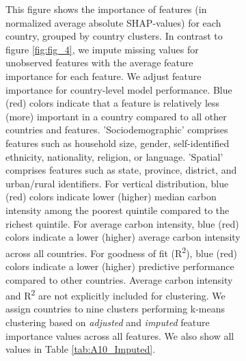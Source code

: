 \begin{figure}[ht!]
\begin{subfigure}[b]{\textwidth}
\begin{subcaption2}
    This figure shows the importance of features (in normalized average absolute SHAP-values) for each country, grouped by country clusters. In contrast to figure \ref{fig:fig_4}, we impute missing values for unobserved features with the average feature importance for each feature. We adjust feature importance for country-level model performance. Blue (red) colors indicate that a feature is relatively less (more) important in a country compared to all other countries and features. 'Sociodemographic' comprises features such as household size, gender, self-identified ethnicity, nationality, religion, or language. 'Spatial' comprises features such as state, province, district, and urban/rural identifiers. For vertical distribution, blue (red) colors indicate lower (higher) median carbon intensity among the poorest quintile compared to the richest quintile. For average carbon intensity, blue (red) colors indicate a lower (higher) average carbon intensity across all countries. For goodness of fit (R\textsuperscript{2}), blue (red) colors indicate a lower (higher) predictive performance compared to other countries. Average carbon intensity and R\textsuperscript{2} are not explicitly included for clustering.
    We assign countries to nine clusters performing k-means clustering based on \textit{adjusted} and \textit{imputed} feature importance values across all features. We also show all values in Table \ref{tab:A10_Imputed}.
    \end{subcaption2}
    \end{subfigure}
    
\end{figure}
\clearpage